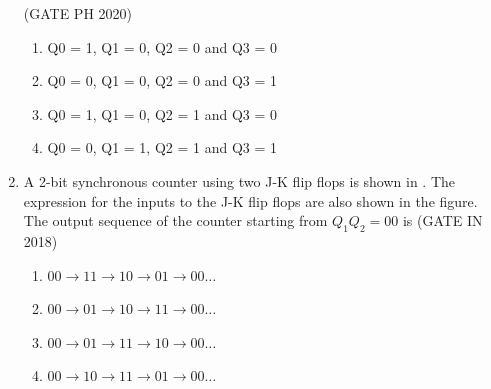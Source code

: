 \begin{enumerate}[label=\arabic*.,ref=\theenumi]
		               \hfill(GATE PH 2020)
\begin{enumerate}
\item  Q0 = 1, Q1 = 0, Q2 = 0 and Q3 = 0 
\item  Q0 = 0, Q1 = 0, Q2 = 0 and Q3 = 1
\item  Q0 = 1, Q1 = 0, Q2 = 1 and Q3 = 0
\item  Q0 = 0, Q1 = 1, Q2 = 1 and Q3 = 1
\end{enumerate}
\begin{figure}[H]
    \centering
    \resizebox{0.75\columnwidth}{!}{%

	}
    \caption{}
	\label{fig:GATE-PH2020,30}
\end{figure}
%

\item A 2-bit synchronous counter using two J-K flip flops is shown
in .
 The expression for the inputs to the J-K flip flops are also shown in the figure. The output sequence of the counter starting from $Q_{1}Q_{2} = 00$ is
\hfill (GATE IN 2018)
\begin{enumerate}
\item $00 \rightarrow 11 \rightarrow 10 \rightarrow 01 \rightarrow 00 \hdots $
\item $00 \rightarrow 01 \rightarrow 10 \rightarrow 11 \rightarrow 00 \hdots $
\item $00 \rightarrow 01 \rightarrow 11 \rightarrow 10 \rightarrow 00 \hdots $
\item $00 \rightarrow 10 \rightarrow 11 \rightarrow 01 \rightarrow 00 \hdots $
\end{enumerate}
%
\begin{figure}[H]
\centering
    \resizebox{\columnwidth}{!}{%

	}
	\caption{}
\label{fig:gate_in_2018_44}
\end{figure}

\end{enumerate}
